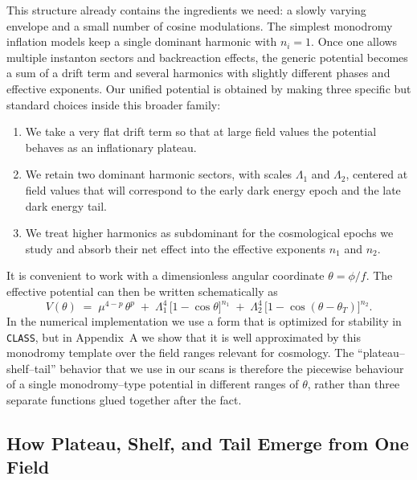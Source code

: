 \documentclass[a4paper,11pt]{article}
\begin{document}
This structure already contains the ingredients we need: a slowly varying envelope and a small number of cosine modulations. The simplest monodromy inflation models keep a single dominant harmonic with $n_i = 1$. Once one allows multiple instanton sectors and backreaction effects, the generic potential becomes a sum of a drift term and several harmonics with slightly different phases and effective exponents. Our unified potential is obtained by making three specific but standard choices inside this broader family:
\begin{enumerate}
    \item We take a very flat drift term so that at large field values the potential behaves as an inflationary plateau.
    \item We retain two dominant harmonic sectors, with scales $\Lambda_1$ and $\Lambda_2$, centered at field values that will correspond to the early dark energy epoch and the late dark energy tail.
    \item We treat higher harmonics as subdominant for the cosmological epochs we study and absorb their net effect into the effective exponents $n_1$ and $n_2$.
\end{enumerate}

It is convenient to work with a dimensionless angular coordinate $\theta = \phi/f$. The effective potential can then be written schematically as
\begin{equation}
    V(\theta) \;=\; \mu^{4-p}\,\theta^{p}
    \;+\; \Lambda_1^4\,\Big[1 - \cos\theta\Big]^{n_1}
    \;+\; \Lambda_2^4\,\Big[1 - \cos(\theta - \theta_T)\Big]^{n_2}.
    \label{eq:unified_potential}
\end{equation}
In the numerical implementation we use a form that is optimized for stability in \texttt{CLASS}, but in Appendix~A we show that it is well approximated by this monodromy template over the field ranges relevant for cosmology. The ``plateau–shelf–tail'' behavior that we use in our scans is therefore the piecewise behaviour of a single monodromy–type potential in different ranges of $\theta$, rather than three separate functions glued together after the fact.


\subsection{How Plateau, Shelf, and Tail Emerge from One Field}
\end{document}

